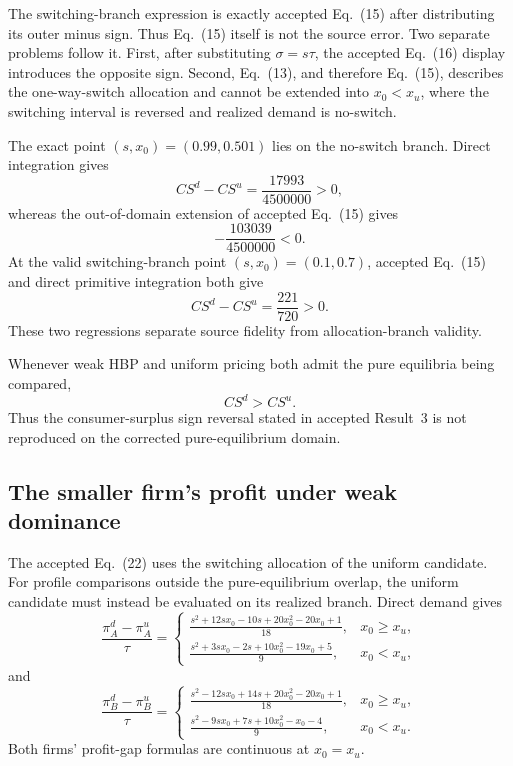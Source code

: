 The switching-branch expression is exactly accepted Eq.~(15) after distributing its outer minus sign. Thus Eq.~(15) itself is not the source error. Two separate problems follow it. First, after substituting \(\sigma=s\tau\), the accepted Eq.~(16) display introduces the opposite sign. Second, Eq.~(13), and therefore Eq.~(15), describes the one-way-switch allocation and cannot be extended into \(x_0<x_u\), where the switching interval is reversed and realized demand is no-switch.

The exact point \((s,x_0)=(0.99,0.501)\) lies on the no-switch branch. Direct integration gives
\[
CS^d-CS^u=\frac{17993}{4500000}>0,
\]
whereas the out-of-domain extension of accepted Eq.~(15) gives
\[
-\frac{103039}{4500000}<0.
\]
At the valid switching-branch point \((s,x_0)=(0.1,0.7)\), accepted Eq.~(15) and direct primitive integration both give
\[
CS^d-CS^u=\frac{221}{720}>0.
\]
These two regressions separate source fidelity from allocation-branch validity.

\begin{corollary}
\label{cor:weak-cs}
Whenever weak HBP and uniform pricing both admit the pure equilibria being compared,
\[
CS^d>CS^u.
\]
Thus the consumer-surplus sign reversal stated in accepted Result~3 is not reproduced on the corrected pure-equilibrium domain.
\end{corollary}

\subsection{The smaller firm's profit under weak dominance}

The accepted Eq.~(22) uses the switching allocation of the uniform candidate. For profile comparisons outside the pure-equilibrium overlap, the uniform candidate must instead be evaluated on its realized branch. Direct demand gives
\[
\frac{\pi_A^d-\pi_A^u}{\tau}
=
\begin{cases}
\displaystyle
\frac{s^2+12sx_0-10s+20x_0^2-20x_0+1}{18},
&x_0\ge x_u,\\[0.9em]
\displaystyle
\frac{s^2+3sx_0-2s+10x_0^2-19x_0+5}{9},
&x_0<x_u,
\end{cases}
\]
and
\begin{equation}
\frac{\pi_B^d-\pi_B^u}{\tau}
=
\begin{cases}
\displaystyle
\frac{s^2-12sx_0+14s+20x_0^2-20x_0+1}{18},
&x_0\ge x_u,\\[0.9em]
\displaystyle
\frac{s^2-9sx_0+7s+10x_0^2-x_0-4}{9},
&x_0<x_u.
\end{cases}
\label{eq:B-profit-gap}
\end{equation}
Both firms' profit-gap formulas are continuous at \(x_0=x_u\).

